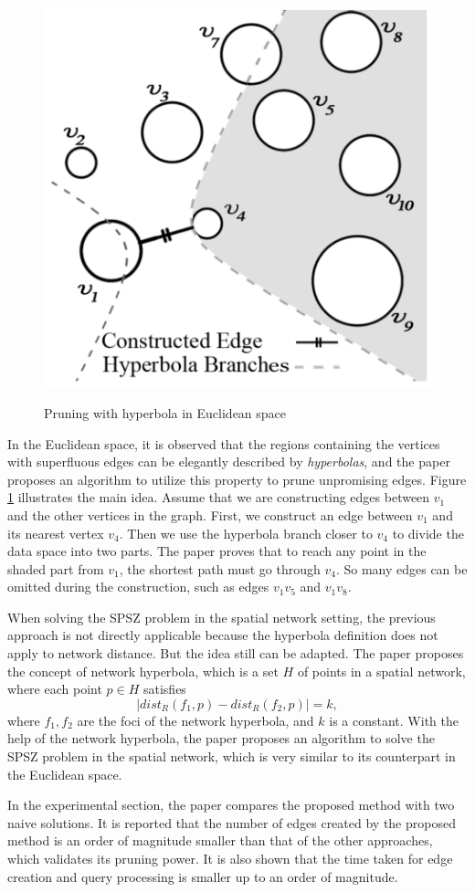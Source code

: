 \documentclass[paper=a4, fontsize=18pt]{article} %
\numberwithin{equation}{section} %
\numberwithin{figure}{section} %
\numberwithin{table}{section} %
\begin{document}
\begin{figure}[h]
  \centering
  \includegraphics[width=.5\linewidth]{8_15_SPSZ.png}\\
  \caption{Pruning with hyperbola in Euclidean space}\label{fig:SPSZ}
\end{figure}

In the Euclidean space, it is observed that the regions containing the vertices with superfluous edges can be elegantly described by \emph{hyperbolas}, and the paper proposes an algorithm to utilize this property to prune unpromising edges. Figure \ref{fig:SPSZ} illustrates the main idea. Assume that we are constructing edges between $v_1$ and the other vertices in the graph. First, we construct an edge between $v_1$ and its nearest vertex $v_4$. Then we use the hyperbola branch closer to $v_4$ to divide the data space into two parts. The paper proves that to reach any point in the shaded part from $v_1$, the shortest path must go through $v_4$. So many edges can be omitted during the construction, such as edges $v_1v_5$ and $v_1v_8$.

When solving the SPSZ problem in the spatial network setting, the previous approach is not directly applicable because the hyperbola definition does not apply to network distance. But the idea still can be adapted. The paper proposes the concept of network hyperbola, which is a set $H$ of points in a spatial network, where each point $p \in H$ satisfies
$$|dist_R(f_1, p) - dist_R(f_2, p)| = k,$$
where $f_1, f_2$ are the foci of the network hyperbola, and $k$ is a constant. With the help of the network hyperbola, the paper proposes an algorithm to solve the SPSZ problem in the spatial network, which is very similar to its counterpart in the Euclidean space.

In the experimental section, the paper compares the proposed method with two naive solutions. It is reported that the number of edges created by the proposed method is an order of magnitude smaller than that of the other approaches, which validates its pruning power. It is also shown that the time taken for edge creation and query processing is smaller up to an order of magnitude.
\end{document}
